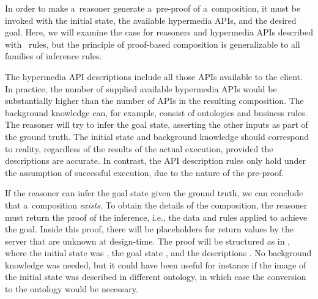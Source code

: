 In order to make a~reasoner generate a~pre-proof of a~composition,
it must be invoked with the initial state, the available hypermedia APIs, and the desired goal.
Here, we will examine the case for \nthree reasoners
and hypermedia APIs described with \restdesc\ \nthree rules,
but the principle of proof-based composition is generalizable
to all families of inference rules.

The hypermedia API descriptions include all those APIs available to the client.
In practice, the number of supplied available hypermedia APIs
would be substantially higher than the number of APIs in the resulting composition.
The background knowledge can, for example, consist of ontologies and business rules.
The reasoner will try to infer the goal state,
asserting the other inputs as part of the ground truth.
The initial state and background knowledge should correspond to reality,
regardless of the results of the actual execution,
provided the descriptions are accurate.
In contrast, the API description rules only hold under the assumption of successful execution,
due to the nature of the pre-proof.


If the reasoner can infer the goal state given the ground truth,
we can conclude that a~composition \emph{exists}.
To obtain the details of the composition,
the reasoner must return the proof of the inference,
i.e., the data and rules applied to achieve the goal.
Inside this proof,
there will be placeholders for return values by the server
that are unknown at design-time.
The proof will be structured as in ,
where the initial state was ,
the goal state ,
and the descriptions .
No background knowledge was needed,
but it could have been useful for instance
if the image of the initial state was described in different ontology,
in which case the conversion to the \dbpedia ontology would be necessary.

